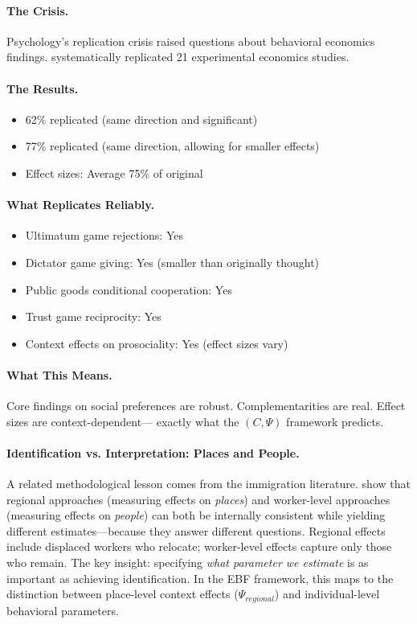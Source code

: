 \paragraph{The Crisis.}
Psychology's replication crisis \citep{camloewetAl2016} raised questions about behavioral economics findings.
\citet{camerer2018evaluating} systematically replicated 21 experimental economics studies.

\paragraph{The Results.}
\begin{itemize}
  \item 62\% replicated (same direction and significant)
  \item 77\% replicated (same direction, allowing for smaller effects)
  \item Effect sizes: Average 75\% of original
\end{itemize}

\paragraph{What Replicates Reliably.}
\begin{itemize}
  \item Ultimatum game rejections: Yes
  \item Dictator game giving: Yes (smaller than originally thought)
  \item Public goods conditional cooperation: Yes
  \item Trust game reciprocity: Yes
  \item Context effects on prosociality: Yes (effect sizes vary)
\end{itemize}

\paragraph{What This Means.}
Core findings on social preferences are robust.
Complementarities are real. Effect sizes are context-dependent---
exactly what the $(C, \Psi)$ framework predicts.

\paragraph{Identification vs. Interpretation: Places and People.}
A related methodological lesson comes from the immigration literature. \citet{dustmann2025immigration} show that regional approaches (measuring effects on \textit{places}) and worker-level approaches (measuring effects on \textit{people}) can both be internally consistent while yielding different estimates---because they answer different questions. Regional effects include displaced workers who relocate; worker-level effects capture only those who remain. The key insight: specifying \textit{what parameter we estimate} is as important as achieving identification. In the EBF framework, this maps to the distinction between place-level context effects ($\Psi_{regional}$) and individual-level behavioral parameters.

